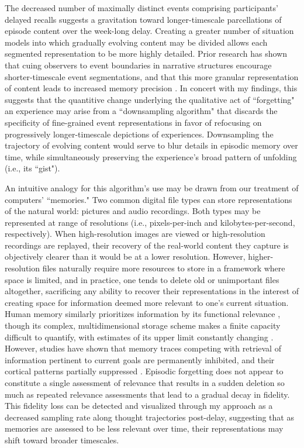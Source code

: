 \documentclass{article}
\begin{document}
The decreased number of maximally distinct events comprising participants' delayed recalls suggests a gravitation toward longer-timescale parcellations of episode content over the week-long delay.  Creating a greater number of situation models into which gradually evolving content may be divided allows each segmented representation to be more highly detailed.  Prior research has shown that cuing observers to event boundaries in narrative structures encourage shorter-timescale event segmentations, and that this more granular representation of content leads to increased memory precision \citep[e.g.,][]{PettEtal16, GoldEtal17, FlorEtal17}.  In concert with my findings, this suggests that the quantitive change underlying the qualitative act of ``forgetting" an experience may arise from a ``downsampling algorithm" that discards the specificity of fine-grained event representations in favor of refocusing on progressively longer-timescale depictions of experiences.  Downsampling the trajectory of evolving content would serve to blur details in episodic memory over time, while simultaneously preserving the experience's broad pattern of unfolding (i.e., its ``gist").  

An intuitive analogy for this algorithm's use may be drawn from our treatment of computers' ``memories."  Two common digital file types can store representations of the natural world: pictures and audio recordings.  Both types may be represented at range of resolutions (i.e., pixels-per-inch and kilobytes-per-second, respectively).  When high-resolution images are viewed or high-resolution recordings are replayed, their recovery of the real-world content they capture is objectively clearer than it would be at a lower resolution.  However, higher-resolution files naturally require more resources to store in a framework where space is limited, and in practice, one tends to delete old or unimportant files altogether, sacrificing any ability to recover their representations in the interest of creating space for information deemed more relevant to one's current situation.  Human memory similarly prioritizes information by its functional relevance \citep{NieuTaka11}, though its complex, multidimensional storage scheme makes a finite capacity difficult to quantify, with estimates of its upper limit constantly changing \citep[e.g.,][]{PereNiez86, WangEtal03, BradEtal08, Rebe10, BartEtal15}.  However, studies have shown that memory traces competing with retrieval of information pertinent to current goals are permanently inhibited, and their cortical patterns partially suppressed \citep{AndeEtal94, WimbEtal15}.  Episodic forgetting does not appear to constitute a single assessment of relevance that results in a sudden deletion so much as repeated relevance assessments that lead to a gradual decay in fidelity.  This fidelity loss can be detected and visualized through my approach as a decreased sampling rate along thought trajectories post-delay, suggesting that as memories are assessed to be less relevant over time, their representations may shift toward broader timescales.
\end{document}
